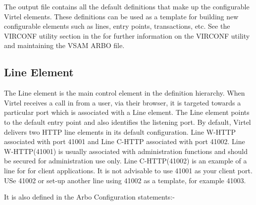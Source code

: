 \documentclass[letterpaper,10pt,english]{sphinxmanual}
\begin{document}

The output file contains all the default definitions that make up the configurable Virtel elements. These definitions can be used as a template for building new configurable elements such as lines, entry points, transactions, etc. See the VIRCONF utility section in the  for further information on the VIRCONF utility and maintaining the VSAM ARBO file.


\subsection{Line Element}
\label{\detokenize{connectivity_guide:line-element}}
The Line element is the main control element in the definition hierarchy. When Virtel receives a call in from a user, via their browser, it is targeted towards a particular port which is associated with a Line element.  The Line element points to the default entry point and also identifies the listening port. By default, Virtel delivers two HTTP line elements in its default configuration. Line W-HTTP associated with port 41001 and Line C-HTTP associated with port 41002. Line W-HTTP(41001) is usually associated with administration functions and should be secured for administration use only. Line C-HTTP(41002) is an example of a line for for client applications. It is not advisable to use 41001 as your client port. USe 41002 or set-up another line using 41002 as a template, for example 41003.


It is also defined in the Arbo Configuration statements:-
\end{document}
